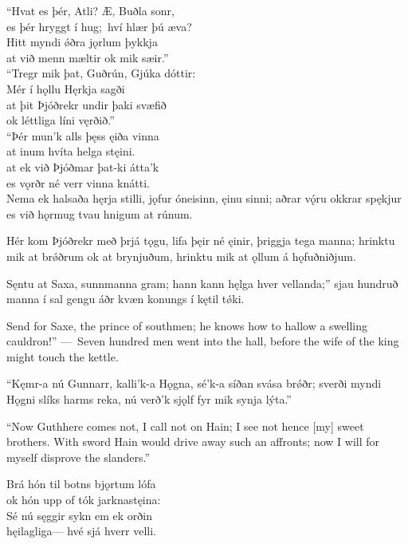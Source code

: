 \bookStart

\bva “Hvat es þér, Atli? \hld Æ, Buðla sonr, \\%
es þér hryggt í hug; \hld hví hlær þú æva? \\%
Hitt myndi ǿðra \hld jǫrlum þykkja \\%
at við menn mæltir \hld ok mik sæir.”\\%

\bva “Tregr mik þat, Guðrún, \hld Gjúka dóttir: \\%
Mér í hǫllu \hld Hęrkja sagði \\%
at þit Þjóðrekr \hld undir þaki svæfið \\%
ok léttliga \hld líni vęrðið.”\\%

\bva “Þér mun’k alls þęss \hld ęiða vinna \\%
at inum hvíta \hld helga stęini. \\%
at ek við Þjóðmar \hld þat-ki átta’k \\%
es vǫrðr né verr \hld vinna knátti.\\%

Nema ek halsaða \hld hęrja stilli,
jǫfur óneisinn, \hld ęinu sinni;
aðrar vǫ́ru \hld okkrar spękjur
es við hǫrmug tvau \hld hnigum at rúnum.

\bva Hér kom Þjóðrekr \hld með þrjá tǫgu,
lifa þęir né ęinir, \hld þriggja tega manna;
hrinktu mik at brǿðrum \hld ok at brynjuðum,
hrinktu mik at ǫllum \hld á hǫfuðniðjum.

\bva Sęntu at Saxa, \hld sunnmanna gram;
hann kann hęlga \hld hver vellanda;”
sjau hundruð manna \hld í sal gengu
áðr kvæn konungs \hld í kętil tǿki.

Send for Saxe, the prince of southmen; he knows how to hallow a swelling cauldron!” — Seven hundred men went into the hall, before the wife of the king might touch the kettle.

\bva “Kęmr-a nú Gunnarr, \hld kalli’k-a Hǫgna,
sé’k-a síðan \hld svása brǿðr;
sverði myndi Hǫgni \hld slíks harms reka,
nú verð’k sjǫlf fyr mik \hld synja lýta.”

“Now Guthhere comes not, I call not on Hain; I see not hence [my] sweet brothers. With sword Hain would drive away such an affronts; now I will for myself disprove the slanders.”

\bva Brá hón til botns \hld bjǫrtum lófa \\%
ok hón upp of tók \hld jarknastęina: \\%
Sé nú sęggir \hld sykn em ek orðin \\%
hęilagliga— \hld hvé sjá hverr velli.\\%

